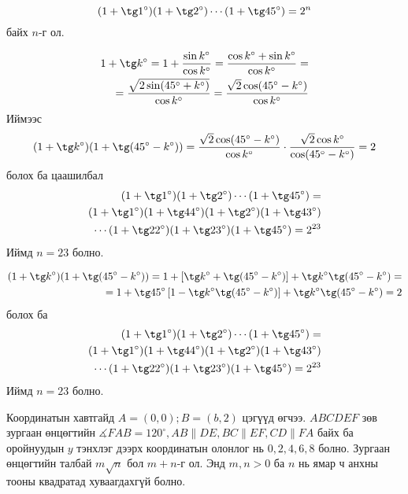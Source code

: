 \documentclass[10pt,a4paper,oneside]{book}
\begin{document}
\Problem
[AMC12P 2002]
\begin{equation*}
(1+\tg 1^\circ)(1+\tg 2^\circ)\cdots(1+\tg 45^\circ) = 2^n
\end{equation*}
байх $n$-г ол.

\ASolution
\begin{align*}
1+\tg k^\circ = 1+\frac{\sin k^\circ}{\cos k^\circ} = \frac{\cos k^\circ + \sin k^\circ}{\cos k^\circ} = \\
= \frac{\sqrt{2\sin(45^\circ + k^\circ)}}{\cos k^\circ} = \frac{\sqrt{2}\cos(45^\circ-k^\circ)}{\cos k^\circ}
\end{align*}
Иймээс
\begin{align*}
(1+\tg k^\circ)(1+\tg(45^\circ-k^\circ)) = \frac{\sqrt{2}\cos(45^\circ - k^\circ)}{\cos k^\circ}\cdot \frac{\sqrt{2}\cos k^\circ}{\cos (45^\circ - k^\circ)} = 2
\end{align*}
болох ба цаашилбал
\begin{align*}
(1+\tg 1^\circ)(1+\tg 2^\circ)\cdots(1+\tg 45^\circ) =\\
(1+\tg 1^\circ)(1+\tg 44^\circ)(1+\tg 2^\circ)(1+\tg 43^\circ)\\
\cdots(1+\tg 22^\circ)(1+\tg 23^\circ)(1+\tg 45^\circ) = 2^{23}
\end{align*}
Иймд $n=23$ болно.

\ASolution
\begin{align*}
(1+\tg k^\circ)(1+\tg (45^\circ-k^\circ)) = 1+\left[\tg k^\circ + \tg (45^\circ - k^\circ)\right] + \tg k^\circ \tg (45^\circ - k^\circ) = \\
= 1+\tg 45^\circ\left[1- \tg k^\circ \tg(45^\circ - k^\circ)\right] + \tg k^\circ \tg (45^\circ - k^\circ) = 2
\end{align*}
болох ба
\begin{align*}
(1+\tg 1^\circ)(1+\tg 2^\circ)\cdots(1+\tg 45^\circ) =\\
(1+\tg 1^\circ)(1+\tg 44^\circ)(1+\tg 2^\circ)(1+\tg 43^\circ)\\
\cdots(1+\tg 22^\circ)(1+\tg 23^\circ)(1+\tg 45^\circ) = 2^{23}
\end{align*}
Иймд $n=23$ болно.

\Problem
[AIME 2003] Координатын хавтгайд $A=(0, 0); B=(b, 2)$ цэгүүд өгчээ. $ABCDEF$ зөв зургаан өнцөгтийн $\measuredangle FAB = 120^\circ, AB \| DE, BC\|EF, CD\|FA$ байх ба оройнуудын $y$ тэнхлэг дээрх координатын олонлог нь ${0, 2, 4, 6, 8}$ болно. Зургаан өнцөгтийн талбай $m\sqrt{n}$ бол $m+n$-г ол. Энд $m, n > 0$ ба $n$ нь ямар ч анхны тооны квадратад хуваагдахгүй болно.

\Note
\end{document}

